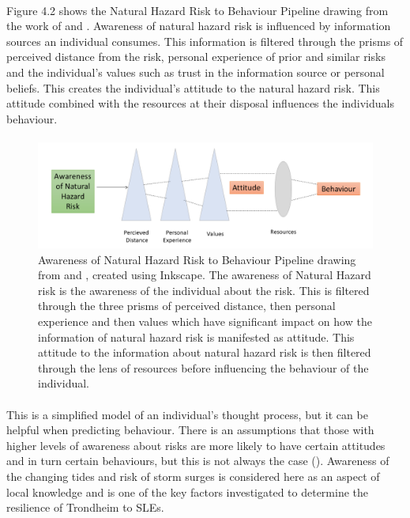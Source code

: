 \paragraph{}
Figure 4.2 shows the Natural Hazard Risk to Behaviour Pipeline drawing from the work of \cite{whitmarsh_are_2008} and \cite{lujala_climate_2015}. Awareness of natural hazard risk is influenced by information sources an individual consumes. This information is filtered through the prisms of perceived distance from the risk, personal experience of prior and similar risks and the individual's values such as trust in the information source or personal beliefs. This creates the individual's attitude to the natural hazard risk. This attitude combined with the resources at their disposal influences the individuals behaviour.

\paragraph{}


\begin{figure}[h]
    \centering
    \includegraphics[width=1\textwidth]{fig_theory/new_awareness_ lujala_whitmarsh.png}
     \caption{Awareness of Natural Hazard Risk to Behaviour Pipeline drawing from \cite{lujala_climate_2015} and \cite{whitmarsh_are_2008}, created using Inkscape.  The awareness of Natural Hazard risk is the awareness of the individual about the risk. This is filtered through the three prisms of perceived distance, then personal experience and then values which have significant impact on how the information of natural hazard risk is manifested as attitude.  
    This attitude to the information about natural hazard risk is then filtered through the lens of resources before influencing the behaviour of the individual.} 
    \label{fig:hazard_to_behaviour}
\end{figure} 
\paragraph{}
This is a simplified model of an individual's thought process, but it can be helpful when predicting behaviour. There is an assumptions that those with higher levels of awareness about risks are more likely to have certain attitudes and in turn certain behaviours, but this is not always the case (\cite{lujala_climate_2015}).  Awareness of the changing tides and risk of storm surges is considered here as an aspect of local knowledge and is one of the key factors investigated to determine the resilience of Trondheim to SLEs. 

